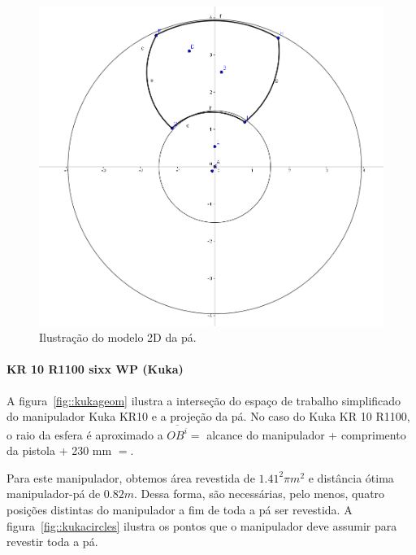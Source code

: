 \begin{figure}[h!]	
	\includegraphics[width=\columnwidth]{figs/bighatch/pa2D.png}
	\caption{Ilustração do modelo 2D da pá.}
	\label{fig::pa2D}
\end{figure}

\paragraph{KR 10 R1100 sixx WP (Kuka)}
A figura~\ref{fig::kukageom} ilustra a interseção do espaço de trabalho
simplificado do manipulador Kuka KR10 e a projeção da pá. No
caso do Kuka KR 10 R1100, o raio da esfera é aproximado a $\overline{OB^i} = $
alcance do manipulador + comprimento da pistola + 230 mm $= $. 

Para este manipulador, obtemos área revestida de $1.41^2\pi m^2$ e distância
ótima manipulador-pá de $0.82 m$. Dessa forma, são necessárias, pelo menos,
quatro posições distintas do manipulador a fim de toda a pá ser revestida. A
figura~\ref{fig::kukacircles} ilustra os pontos que o manipulador deve assumir
para revestir toda a pá. 


